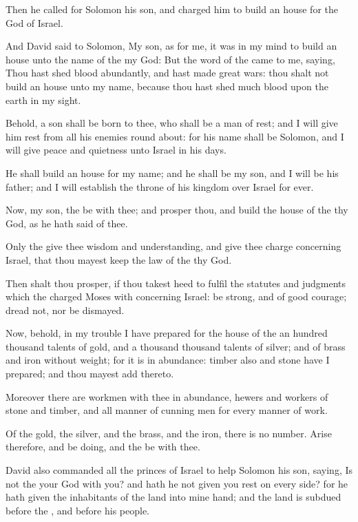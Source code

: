 \verse Then he called for Solomon his son, and charged him to build an house for the \LORD God of Israel.

\verse And David said to Solomon, My son, as for me, it was in my mind to build an house unto the name of the \LORD my God: \verse But the word of the \LORD came to me, saying, Thou hast shed blood abundantly, and hast made great wars: thou shalt not build an house unto my name, because thou hast shed much blood upon the earth in my sight.

\verse Behold, a son shall be born to thee, who shall be a man of rest; and I will give him rest from all his enemies round about: for his name shall be Solomon, and I will give peace and quietness unto Israel in his days.

\verse He shall build an house for my name; and he shall be my son, and I will be his father; and I will establish the throne of his kingdom over Israel for ever.

\verse Now, my son, the \LORD be with thee; and prosper thou, and build the house of the \LORD thy God, as he hath said of thee.

\verse Only the \LORD give thee wisdom and understanding, and give thee charge concerning Israel, that thou mayest keep the law of the \LORD thy God.

\verse Then shalt thou prosper, if thou takest heed to fulfil the statutes and judgments which the \LORD charged Moses with concerning Israel: be strong, and of good courage; dread not, nor be dismayed.

\verse Now, behold, in my trouble I have prepared for the house of the \LORD an hundred thousand talents of gold, and a thousand thousand talents of silver; and of brass and iron without weight; for it is in abundance: timber also and stone have I prepared; and thou mayest add thereto.

\verse Moreover there are workmen with thee in abundance, hewers and workers of stone and timber, and all manner of cunning men for every manner of work.

\verse Of the gold, the silver, and the brass, and the iron, there is no number. Arise therefore, and be doing, and the \LORD be with thee.

\verse David also commanded all the princes of Israel to help Solomon his son, saying, \verse Is not the \LORD your God with you? and hath he not given you rest on every side? for he hath given the inhabitants of the land into mine hand; and the land is subdued before the \LORD, and before his people.

